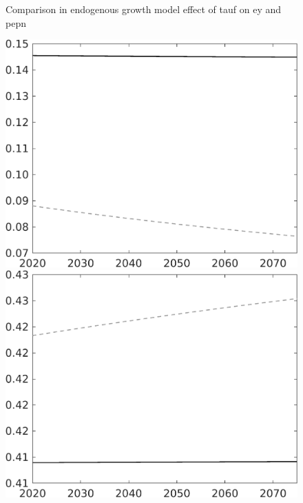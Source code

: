 \documentclass[12pt]{article}
\begin{document}
	\begin{figure}{Comparison in endogenous growth model effect of tauf on ey and pepn }
	\begin{minipage}[]{0.32\textwidth}
		\includegraphics[width=1\textwidth]{../../codding_model/own_basedOnFried/optimalPol_010922_revision/figures/all_13Sept22/LevTaufNoTauf_TaulCalib_regime0_pepn_spillover0_nsk0_xgr0_knspil1_sep0_LFlimit0_emsbase0_countec0_GovRev0_etaa0.79_lgd0.png}
	\end{minipage}
	\begin{minipage}[]{0.32\textwidth}
		\includegraphics[width=1\textwidth]{../../codding_model/own_basedOnFried/optimalPol_010922_revision/figures/all_13Sept22/LevTaufNoTauf_TaulCalib_regime0_EY_spillover0_nsk0_xgr0_knspil1_sep0_LFlimit0_emsbase0_countec0_GovRev0_etaa0.79_lgd0.png}

\end{minipage}
\end{figure}
\end{document}
